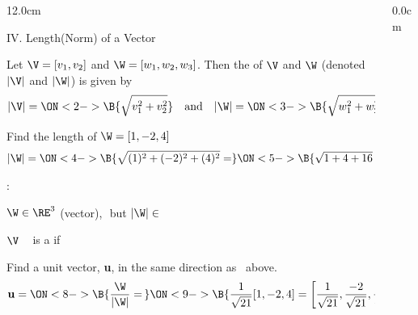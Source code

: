 \begin{frame}
\begin{columns}
\begin{column}{12.0cm}

{IV. Length(Norm) of a Vector}

\vspace{0.2cm}

\scriptsize

\DEF Let $\V = [v_1,v_2]$ and $\W = [w_1,w_2,w_3]$.  Then the  of $\V$ and $\W$ (denoted $|\V|$ and $|\W|$) is given by
\begin{align*}
	|\V| = \ON<2->{\B{\sqrt{v_1^2 + v_2^2}}} \quad \text{and} \quad |\W| = \ON<3->{\B{\sqrt{w_1^2 + w_2^2 + w_3^2}}}
\end{align*}

\EX Find the length of $\W = [1,-2,4]$
\begin{align*}
	|\W| = \ON<4->{\B{\sqrt{(1)^2 + (-2)^2 + (4)^2} =}} \ON<5->{\B{\sqrt{1+4+16} = \sqrt{21}}}
\end{align*}

:

\vspace{0.1cm}

\OBUL $\W \in \RE^3$ (vector),\,\, but $|\W| \in $ \\

\vspace{0.4cm}

\DEF $\V$ \,\,\, is a  if \,\,\, 

\vspace{0.4cm}

\EX Find a unit vector, {\bf u}, in the same direction as \W \, above.
\begin{align*}
	{\bf u} = \ON<8->{\B{\frac{\W}{|\W|} =\,}} \ON<9->{\B{\frac{1}{\sqrt{21}}[1,-2,4] = \left[\frac{1}{\sqrt{21}},\frac{-2}{\sqrt{21}},\frac{4}{\sqrt{21}}\right]}} \\
\end{align*}

\end{column}
\begin{column}{0.0cm}\end{column}
\end{columns}
\end{frame}

